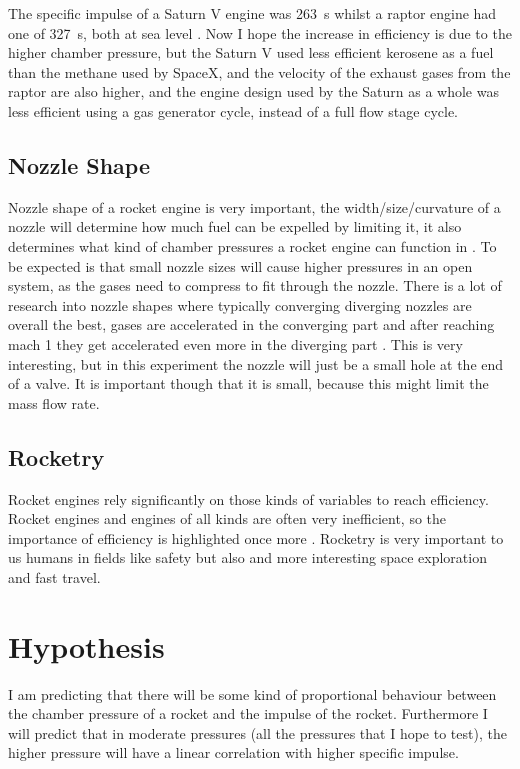 \documentclass[12pt,a4paper]{article}
\begin{document}
The specific impulse of a Saturn V engine was \SI{263}{\second} whilst a raptor engine had one of \SI{327}{\second}, both at sea level \cite{ref8}. Now I hope the increase in efficiency is due to the higher chamber pressure, but the Saturn V used less efficient kerosene as a fuel than the methane used by SpaceX, and the velocity of the exhaust gases from the raptor are also higher, and the engine design used by the Saturn as a whole was less efficient using a gas generator cycle, instead of a full flow stage cycle.

\subsection{Nozzle Shape}

Nozzle shape of a rocket engine is very important, the width/size/curvature of a nozzle will determine how much fuel can be expelled by limiting it, it also determines what kind of chamber pressures a rocket engine can function in \cite{ref10}. To be expected is that small nozzle sizes will cause higher pressures in an open system, as the gases need to compress to fit through the nozzle. There is a lot of research into nozzle shapes where typically converging diverging nozzles are overall the best, gases are accelerated in the converging part and after reaching mach 1 they get accelerated even more in the diverging part \cite{ref11}. This is very interesting, but in this experiment the nozzle will just be a small hole at the end of a valve. It is important though that it is small, because this might limit the mass flow rate.

\subsection{Rocketry}

Rocket engines rely significantly on those kinds of variables to reach efficiency. Rocket engines and engines of all kinds are often very inefficient, so the importance of efficiency is highlighted once more \cite{ref12,ref13}. Rocketry is very important to us humans in fields like safety but also and more interesting space exploration and fast travel.

\section{Hypothesis}

I am predicting that there will be some kind of proportional behaviour between the chamber pressure of a rocket and the impulse of the rocket. Furthermore I will predict that in moderate pressures (all the pressures that I hope to test), the higher pressure will have a linear correlation with higher specific impulse.
\end{document}
